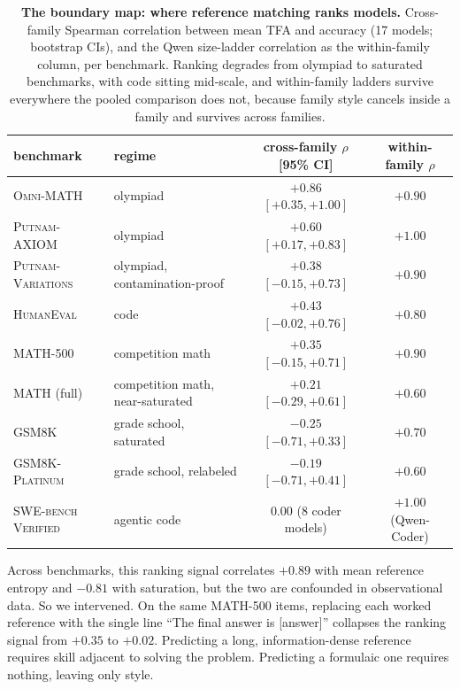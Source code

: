\documentclass[11pt]{article}
\newcommand{\tfa}{\textsc{TFA}}
\begin{document}
\begin{table}[t]
\centering
\small
\begin{tabular}{llcc}
\toprule
benchmark & regime & cross-family $\rho$ [95\% CI] & within-family $\rho$ \\
\midrule
\textsc{Omni-MATH} & olympiad & $+0.86$ $[+0.35, +1.00]$ & $+0.90$ \\
\textsc{Putnam-AXIOM} & olympiad & $+0.60$ $[+0.17, +0.83]$ & $+1.00$ \\
\textsc{Putnam-Variations} & olympiad, contamination-proof & $+0.38$ $[-0.15, +0.73]$ & $+0.90$ \\
\textsc{HumanEval} & code & $+0.43$ $[-0.02, +0.76]$ & $+0.80$ \\
\textsc{MATH-500} & competition math & $+0.35$ $[-0.15, +0.71]$ & $+0.90$ \\
\textsc{MATH} (full) & competition math, near-saturated & $+0.21$ $[-0.29, +0.61]$ & $+0.60$ \\
\textsc{GSM8K} & grade school, saturated & $-0.25$ $[-0.71, +0.33]$ & $+0.70$ \\
\textsc{GSM8K-Platinum} & grade school, relabeled & $-0.19$ $[-0.71, +0.41]$ & $+0.60$ \\
\textsc{SWE-bench Verified} & agentic code & $0.00$ (8 coder models) & $+1.00$ (Qwen-Coder) \\
\bottomrule
\end{tabular}
\caption{\textbf{The boundary map: where reference matching ranks models.}
Cross-family Spearman correlation between mean \tfa{} and accuracy (17 models; bootstrap CIs), and the Qwen size-ladder correlation as the within-family column, per benchmark.
Ranking degrades from olympiad to saturated benchmarks, with code sitting mid-scale, and within-family ladders survive everywhere the pooled comparison does not, because family style cancels inside a family and survives across families.}
\label{tab:map}
\end{table}
Across benchmarks, this ranking signal correlates $+0.89$ with mean reference entropy and $-0.81$ with saturation, but the two are confounded in observational data.
So we intervened.
On the same \textsc{MATH-500} items, replacing each worked reference with the single line ``The final answer is [answer]'' collapses the ranking signal from $+0.35$ to $+0.02$.
Predicting a long, information-dense reference requires skill adjacent to solving the problem.
Predicting a formulaic one requires nothing, leaving only style.
\end{document}
